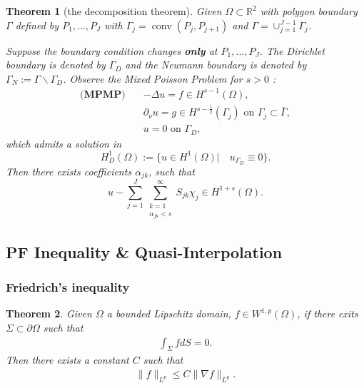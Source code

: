 \documentclass[a4paper,12pt,oneside,fleqn]{book}
\newtheorem{theorem}{Theorem}[section]
\theoremstyle{definition}
\theoremstyle{remark}
\DeclareMathOperator*{\conv}{conv}
\begin{document}
\begin{theorem}[the decomposition theorem]
	Given $\Omega \subset \mathbb{R}^2$ with polygon boundary $\Gamma$ defined by $P_1, \dots, P_J$ with $\Gamma_j = \conv(P_j, P_{j + 1})$ and $\Gamma = \cup_{j = 1}^{J -1} \Gamma_j$.\par 
	Suppose the boundary condition changes \textbf{only} at $P_1, \dots, P_J$.  The Dirichlet boundary is denoted by $\Gamma_D$ and the Neumann boundary is denoted by $\Gamma_N:= \Gamma \backslash \Gamma_D$. Observe the Mixed Poisson Problem for $s > 0$ :
	\begin{equation}
	\begin{aligned}
		\textbf{(MPMP)} \quad
		& - \Delta u = f \in H^{s - 1}(\Omega),\\
		& \partial_\nu u = g \in H^{s - \frac{1}{2}}(\Gamma_j) \text{ on } \Gamma_j \subset \bar{\Gamma},\\
		& u = 0 \text{ on } \Gamma_D,
	\end{aligned}
	\end{equation}
	which admits a solution in 
	\begin{equation}
		H^1_D(\Omega):= \{ u \in H^1(\Omega)|\quad u_{\Gamma_D} \equiv 0 \}.
	\end{equation}
	Then there exists coefficients $\alpha_{jk}$, such that
	\begin{equation}
		u -  \sum_{j = 1}^J \sum_{\substack{k = 1\\ \alpha_{jk} < s}}^\infty S_{jk} \chi_{j} \in H^{1 + s}(\Omega).
	\end{equation} 
\end{theorem}



\subsection{PF Inequality \& Quasi-Interpolation}
\subsubsection{Friedrich's inequality}
\begin{theorem}
	Given $\Omega$ a bounded Lipschitz domain, $f  \in W^{1, p}(\Omega)$, if there exits $\Sigma \subset \partial\Omega$ such that 
	\begin{align*}
		\int_\Sigma f dS = 0. 
	\end{align*}
	Then there exists a constant $C$ such that 
	\begin{align*}
		\|f\|_{L^p} \le C \|\nabla f\|_{L^p}. 
	\end{align*}
\end{theorem}
\end{document}
